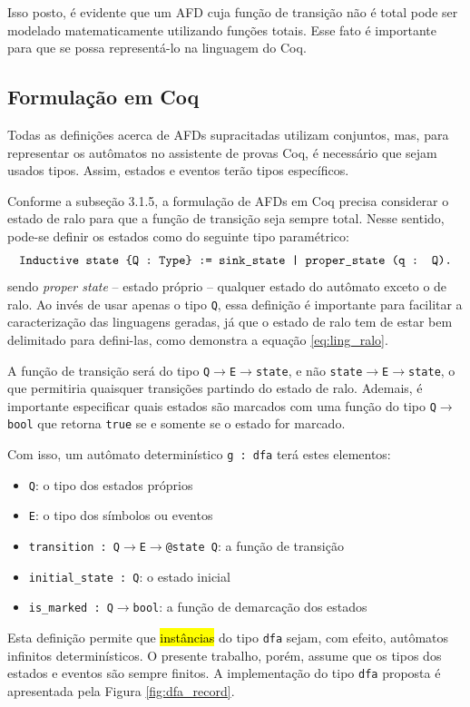 Isso posto, é evidente que um AFD cuja função de transição não é total pode ser modelado matematicamente utilizando funções totais. Esse fato é importante para que se possa representá-lo na linguagem do Coq.

\subsection{Formulação em Coq}

Todas as definições acerca de AFDs supracitadas utilizam conjuntos, mas, para representar os autômatos no assistente de provas Coq, é necessário que sejam usados tipos. Assim, estados e eventos terão tipos específicos.

Conforme a subseção 3.1.5, a formulação de AFDs em Coq precisa considerar o estado de ralo para que a função de transição seja sempre total. Nesse sentido, pode-se definir os estados como do seguinte tipo paramétrico: $$\text{\texttt{Inductive state \{Q : Type\} := sink\_state | proper\_state (q : Q).}}$$ sendo \textit{proper state} -- estado próprio -- qualquer estado do autômato exceto o de ralo. Ao invés de usar apenas o tipo \texttt{Q}, essa definição é importante para facilitar a caracterização das linguagens geradas, já que o estado de ralo tem de estar bem delimitado para defini-las, como demonstra a equação \ref{eq:ling_ralo}.

A função de transição será do tipo \texttt{Q$\rightarrow$E$\rightarrow$state}, e não \texttt{state$\rightarrow$E$\rightarrow$state}, o que permitiria quaisquer transições partindo do estado de ralo. Ademais, é importante especificar quais estados são marcados com uma função do tipo \texttt{Q$\rightarrow$bool} que retorna \texttt{true} se e somente se o estado for marcado.

Com isso, um autômato determinístico \texttt{g : dfa} terá estes elementos: \begin{itemize}
	\item \texttt{Q}: o tipo dos estados próprios
	\item \texttt{E}: o tipo dos símbolos ou eventos
	\item  \texttt{transition : Q$\to$E$\to$@state Q}: a função de transição
	\item \texttt{initial\_state : Q}: o estado inicial
	\item \texttt{is\_marked : Q$\to$bool}: a função de demarcação dos estados
\end{itemize}

Esta definição permite que \hl{instâncias} do tipo \texttt{dfa} sejam, com efeito, autômatos infinitos determinísticos. O presente trabalho, porém, assume que os tipos dos estados e eventos são sempre finitos. A implementação do tipo \texttt{dfa} proposta é apresentada pela Figura \ref{fig:dfa_record}.

